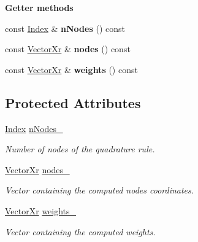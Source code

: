 \begin{Indent}{\bf Getter methods}\par
\begin{DoxyCompactItemize}
\item 
\hypertarget{classQuadratureRule_a32e8457e19f3f8f4096e82a0cd759a03}{const \hyperlink{typedefs_8h_a2c726f8f32697958e9d6c2afecda531d}{Index} \& {\bfseries n\-Nodes} () const }\label{classQuadratureRule_a32e8457e19f3f8f4096e82a0cd759a03}

\item 
\hypertarget{classQuadratureRule_ac955b3953fe9174d6c9c4c9f519b4858}{const \hyperlink{typedefs_8h_aae6cee78ed9cd8f234ed8cb48682548a}{Vector\-Xr} \& {\bfseries nodes} () const }\label{classQuadratureRule_ac955b3953fe9174d6c9c4c9f519b4858}

\item 
\hypertarget{classQuadratureRule_a34502030990595ad6c2ededfb52383ae}{const \hyperlink{typedefs_8h_aae6cee78ed9cd8f234ed8cb48682548a}{Vector\-Xr} \& {\bfseries weights} () const }\label{classQuadratureRule_a34502030990595ad6c2ededfb52383ae}

\end{DoxyCompactItemize}
\end{Indent}
\subsection*{Protected Attributes}
\begin{DoxyCompactItemize}
\item 
\hypertarget{classQuadratureRule_a574676917a0d7d70140f4ed29bb1e8b4}{\hyperlink{typedefs_8h_a2c726f8f32697958e9d6c2afecda531d}{Index} \hyperlink{classQuadratureRule_a574676917a0d7d70140f4ed29bb1e8b4}{n\-Nodes\-\_\-}}\label{classQuadratureRule_a574676917a0d7d70140f4ed29bb1e8b4}

\begin{DoxyCompactList}\small\item\em Number of nodes of the quadrature rule. \end{DoxyCompactList}\item 
\hypertarget{classQuadratureRule_af96d558adb075a6049017281e98fbed3}{\hyperlink{typedefs_8h_aae6cee78ed9cd8f234ed8cb48682548a}{Vector\-Xr} \hyperlink{classQuadratureRule_af96d558adb075a6049017281e98fbed3}{nodes\-\_\-}}\label{classQuadratureRule_af96d558adb075a6049017281e98fbed3}

\begin{DoxyCompactList}\small\item\em Vector containing the computed nodes coordinates. \end{DoxyCompactList}\item 
\hypertarget{classQuadratureRule_a35b6b677135284647f99765144b3af7a}{\hyperlink{typedefs_8h_aae6cee78ed9cd8f234ed8cb48682548a}{Vector\-Xr} \hyperlink{classQuadratureRule_a35b6b677135284647f99765144b3af7a}{weights\-\_\-}}\label{classQuadratureRule_a35b6b677135284647f99765144b3af7a}

\begin{DoxyCompactList}\small\item\em Vector containing the computed weights. \end{DoxyCompactList}\end{DoxyCompactItemize}
